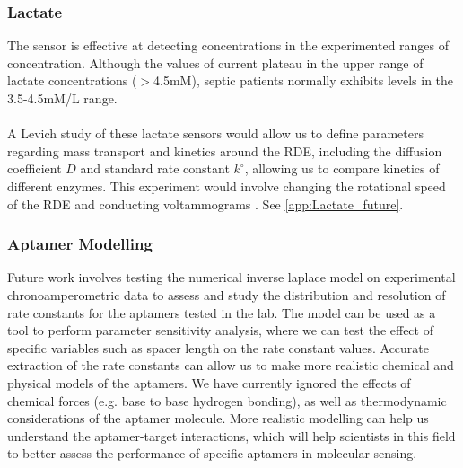 \subsubsection{Lactate}
The sensor is effective at detecting concentrations in the experimented ranges of concentration. Although the values of current plateau in the upper range of lactate concentrations ($>$4.5mM), septic patients normally exhibits levels in the 3.5-4.5mM/L range.\\\\
A Levich study of these lactate sensors would allow us to define parameters regarding mass transport and kinetics around the RDE, including the diffusion coefficient $D$ and standard rate constant $k^{\circ}$, allowing us to compare kinetics of different enzymes. This experiment would involve changing the rotational speed of the RDE and conducting voltammograms \cite{treimer2002consideration}. See \autoref{app:Lactate_future}.
\subsubsection{Aptamer Modelling}
Future work involves testing the numerical inverse laplace model on experimental chronoamperometric data to assess and study the distribution and resolution of rate constants for the aptamers tested in the lab. The model can be used as a tool to perform parameter sensitivity analysis, where we can test the effect of specific variables such as spacer length on the rate constant values. Accurate extraction of the rate constants can allow us to make more realistic chemical and physical models of the aptamers. We have currently ignored the effects of chemical forces (e.g. base to base hydrogen bonding), as well as thermodynamic considerations of the aptamer molecule. More realistic modelling can help us understand the aptamer-target interactions, which will help scientists in this field to better assess the performance of specific aptamers in molecular sensing.
\newpage
